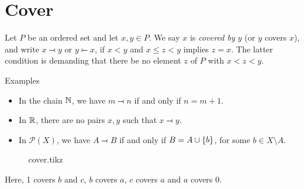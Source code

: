 \documentclass[../main-sheet.tex]{subfiles}
\begin{document}
\section{Cover}
\begin{defn}
    Let \(P\) be an ordered set and let \(x,y\in P\). We say \(x\) is \emph{covered by} \(y\) (or \(y\) covers \(x\)), and write \(x\lefttail y\) or \(y\righttail x\), if \(x<y\) and \(x\leq z<y\) implies \(z=x\). The latter condition is demanding that there be no element \(z\) of \(P\) with \(x<z<y\).
\end{defn}
Examples\begin{itemize}
    \item In the chain \(\mathbb{N}\), we have \(m\lefttail n\) if and only if \(n=m+1\).
    \item In \(\mathbb{R}\), there are no pairs \(x,y\) such that \(x\lefttail y\).
    \item In \(\mathcal{P}(X)\), we have \(A\lefttail B\) if and only if \(B=A\cup \left\{b\right\}\), for some \(b\in X\setminus A\).
\end{itemize}
\begin{figure}[H]
    \centering
    {cover.tikz}
\end{figure}
Here, 1 covers \(b\) and \(c\), \(b\) covers \(a\), \(c\) covers \(a\) and \(a\) covers \(0\).
\end{document}
